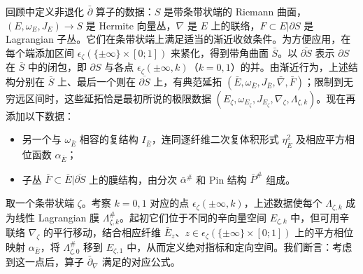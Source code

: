 回顾中定义非退化 $\bar\partial$ 算子的数据：$S$ 是带条带状端的 Riemann 曲面，$(E,\allowbreak \omega_E,\allowbreak J_E)\to S$ 是 Hermite 向量丛，$\nabla$ 是 $E$ 上的联络，$F\subset E|\partial S$ 是 Lagrangian 子丛。它们在条带状端上满足适当的渐近收敛条件。为方便应用，在每个端添加区间 $\epsilon_\zeta(\{\pm\infty\}\times[0;1])$ 来紧化，得到带角曲面 $\bar S$。以 $\overline{\partial S}$ 表示 $\partial S$ 在 $\bar S$ 中的闭包，即 $\partial S$ 与各点 $\epsilon_\zeta(\pm\infty,\allowbreak k)$（$k=0,\allowbreak 1$）的并。由渐近行为，上述结构分别在 $\bar S$ 上、最后一个则在 $\overline{\partial S}$ 上，有典范延拓 $(\bar E,\allowbreak \omega_{\bar E},\allowbreak J_{\bar E},\allowbreak \bar\nabla,\allowbreak \bar F)$；限制到无穷远区间时，这些延拓恰是最初所说的极限数据 $(E_\zeta,\allowbreak \omega_{E_\zeta},\allowbreak J_{E_\zeta},\allowbreak \nabla_\zeta,\allowbreak \Lambda_{\zeta,\allowbreak k})$。现在再添加以下数据：
\begin{itemize}
\item 另一个与 $\omega_{\bar E}$ 相容的复结构 $I_{\bar E}$，连同逐纤维二次复体积形式 $\eta_{\bar E}^2$ 及相应平方相位函数 $\alpha_{\bar E}$；
\item 子丛 $\bar F\subset\bar E|\overline{\partial S}$ 上的膜结构，由分次 $\bar\alpha^\#$ 和 Pin 结构 $\bar P^\#$ 组成。
\end{itemize}
取一个条带状端 $\zeta$。考察 $k=0,\allowbreak 1$ 对应的点 $\epsilon_\zeta(\pm\infty,\allowbreak k)$，上述数据使每个 $\Lambda_{\zeta,\allowbreak k}$ 成为线性 Lagrangian 膜 $\Lambda_{\zeta,\allowbreak k}^\#$。起初它们位于不同的辛向量空间 $E_{\zeta,\allowbreak k}$ 中，但可用辛联络 $\nabla_\zeta$ 的平行移动，结合相应纤维 $\bar E_z$、$z\in\epsilon_\zeta(\{\pm\infty\}\times[0;1])$ 上的平方相位映射 $\alpha_{\bar E}$，将 $\Lambda_{\zeta,\allowbreak 0}^\#$ 移到 $E_{\zeta,\allowbreak 1}$ 中，从而定义绝对指标和定向空间。我们断言：考虑到这一点后，算子 $\bar\partial_\nabla$ 满足的对应公式。

